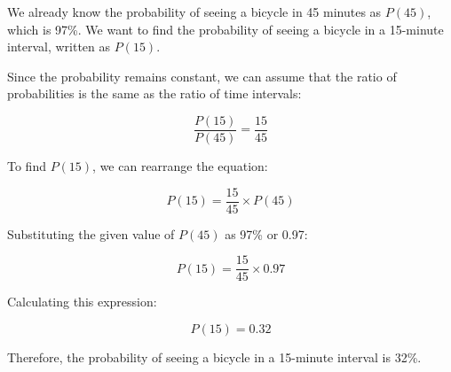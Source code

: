 	We already know the probability of seeing a bicycle in 45 minutes as $ P(45) $, which is 97\%. We want to find the probability of seeing a bicycle in a 15-minute interval, written as $ P(15) $.
	
	Since the probability remains constant, we can assume that the ratio of probabilities is the same as the ratio of time intervals:
	
	\[
	\frac{{P(15)}}{{P(45)}} = \frac{{15}}{{45}}\]
	
	To find $ P(15) $, we can rearrange the equation:
	
	\[P(15) = \frac{{15}}{{45}} \times P(45)\]
	
	Substituting the given value of $ P(45) $ as 97\% or 0.97:
	
	\[P(15) = \frac{{15}}{{45}} \times 0.97\]
	
	Calculating this expression:
	
	\[P(15) = 0.32\]
	
	Therefore, the probability of seeing a bicycle in a 15-minute interval is 32\%.

	\newpage
